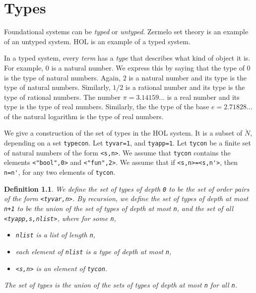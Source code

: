 \documentclass[cup9a]{cupbook}
\newtheorem{definition}{Definition}[chapter]
\begin{document}
\chapter{Types}

Foundational systems can be {\it typed} or {\it untyped}.  Zermelo set
theory is an example of an untyped system.  HOL is an example of a typed
system.

In a typed system, every  {\it term} has a {\it type} that describes
what kind of object it is.   For example, $0$ is a natural number.  We express this by saying that the type of $0$ is the type of natural numbers.  Again, $2$ is a natural number and its type is the type of natural numbers.  Similarly, $1/2$ is a rational number and its type is the type of rational numbers.  The number $\pi = 3.14159\ldots$ is a real number and its type is the type of real numbers.  Similarly, the the type of the base $e=2.71828\ldots$ of the natural logarithm is the type of real numbers.

\bigskip
We give a construction of the set of types in the HOL system.  It is a subset of
$\ring{N}$, depending on a set \verb!typecon!.
Let \verb!tyvar=1!, and \verb!tyapp=1!.
Let \verb!tycon! be a finite set of natural numbers of the form \verb!<s,n>!.
We assume that \verb!tycon! contains the elements
\verb!<"bool",0>! and \verb!<"fun",2>!.  We assume that if \verb!<s,n>=<s,n'>!,
then \verb!n=n'!, for any two elements of \verb!tycon!.

\begin{definition}
We define the set of types of depth \verb!0! to be
the set of order pairs of the form \verb!<tyvar,n>!.  By recursion, we define
the set of types of depth at most \verb!n+1! to be the union of the set
of types of depth at most \verb!n!, and the set of all \verb!<tyapp,s,nlist>!, where for some \verb!n!,
\begin{itemize}
\item \verb!nlist! is a list of length \verb!n!, 
\item each element of \verb!nlist! is a type of depth at most \verb!n!,
\item \verb!<s,n>! is an element of \verb!tycon!.
\end{itemize}
The set of types is the union of the sets of types of depth at most \verb!n! for all \verb!n!.  
\end{definition}
\end{document}
